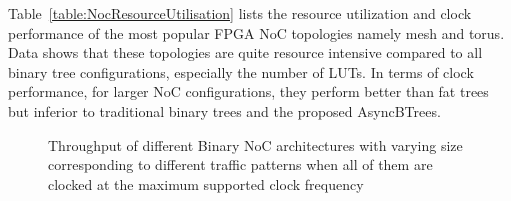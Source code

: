 
Table~\ref{table:NocResourceUtilisation} lists the resource utilization and clock performance of the most popular FPGA NoC topologies namely mesh and torus.
Data shows that these topologies are quite resource intensive compared to all binary tree configurations, especially the number of LUTs.
In terms of clock performance, for larger NoC configurations, they perform better than fat trees but inferior to traditional binary trees and the proposed AsyncBTrees.


\begin{figure}[t]
\centering     %
{}
\caption{Throughput of different Binary NoC architectures with varying size corresponding to different traffic patterns when all of them 
are clocked at the maximum supported clock frequency}
\label{fig:tputmax}
\end{figure}

